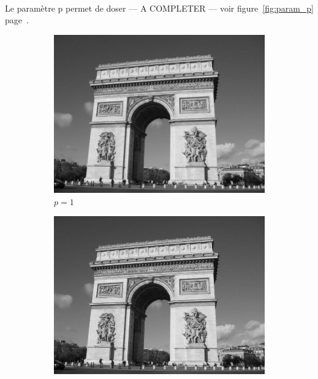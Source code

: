\documentclass[a4paper,10pt]{report}
\begin{document}
\paragraph{}
Le paramètre p permet de doser --- A COMPLETER --- voir figure~\ref{fig:param_p} page~\pageref{fig:param_p}.


\begin{figure}[h]
 
  \begin{subfigure}{0.32\textwidth}
    \includegraphics[width=0.99\linewidth]{ressource/flouresultat_p1.png} 
    \caption{\(p=1\)}
    \label{fig:p1}
  \end{subfigure}
  \begin{subfigure}{0.32\textwidth}
    \includegraphics[width=0.99\linewidth]{ressource/flouresultat_p6.png} 

\end{subfigure}
\end{figure}
\end{document}
